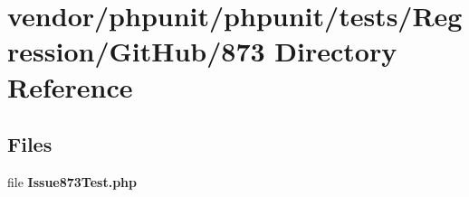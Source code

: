 \section{vendor/phpunit/phpunit/tests/\+Regression/\+Git\+Hub/873 Directory Reference}
\label{dir_f32077976f11e421e1d1d687979b6361}
\subsection*{Files}
\begin{DoxyCompactItemize}
\item 
file {\bf Issue873\+Test.\+php}
\end{DoxyCompactItemize}
